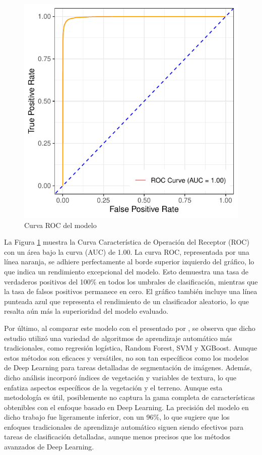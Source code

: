 \begin{figure}
 \centering
 \includegraphics[width=0.8\columnwidth]{roc}
 \caption{Curva ROC del modelo}
 \label{fig:roc}
\end{figure}

La Figura \ref{fig:roc} muestra la Curva Característica de Operación del Receptor (ROC) con un área bajo la curva (AUC) de 1.00. La curva ROC, representada por una línea naranja, se adhiere perfectamente al borde superior izquierdo del gráfico, lo que indica un rendimiento excepcional del modelo. Esto demuestra una tasa de verdaderos positivos del 100\% en todos los umbrales de clasificación, mientras que la tasa de falsos positivos permanece en cero. El gráfico también incluye una línea punteada azul que representa el rendimiento de un clasificador aleatorio, lo que resalta aún más la superioridad del modelo evaluado.

Por último, al comparar este modelo con el presentado por \cite{diaz2023}, se observa que dicho estudio utilizó una variedad de algoritmos de aprendizaje automático más tradicionales, como regresión logística, Random Forest, SVM y XGBoost. Aunque estos métodos son eficaces y versátiles, no son tan específicos como los modelos de Deep Learning para tareas detalladas de segmentación de imágenes. Además, dicho análisis incorporó índices de vegetación y variables de textura, lo que enfatiza aspectos específicos de la vegetación y el terreno. Aunque esta metodología es útil, posiblemente no captura la gama completa de características obtenibles con el enfoque basado en Deep Learning. La precisión del modelo en dicho trabajo fue ligeramente inferior, con un 96\%, lo que sugiere que los enfoques tradicionales de aprendizaje automático siguen siendo efectivos para tareas de clasificación detalladas, aunque menos precisos que los métodos avanzados de Deep Learning.
